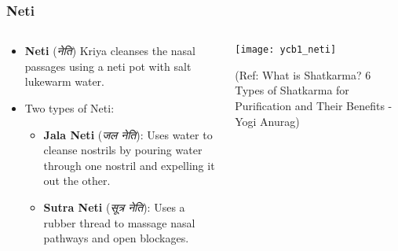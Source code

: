 \begin{frame}[fragile]\frametitle{Neti}
\begin{columns}
    \begin{column}[T]{0.5\linewidth}
      \begin{itemize}
          \item \textbf{Neti} (\textit{नेति}) Kriya cleanses the nasal passages using a neti pot with salt lukewarm water.
          \item Two types of Neti:
            \begin{itemize}
              \item \textbf{Jala Neti} (\textit{जल नेति}): Uses water to cleanse nostrils by pouring water through one nostril and expelling it out the other.
              \item \textbf{Sutra Neti} (\textit{सूत्र नेति}): Uses a rubber thread to massage nasal pathways and open blockages.
            \end{itemize}
      \end{itemize}
    \end{column}
    \begin{column}[T]{0.5\linewidth}
        \begin{center}
        \texttt{[image: ycb1\_neti]}
		
		{\tiny (Ref: What is Shatkarma? 6 Types of Shatkarma for Purification and Their Benefits - Yogi Anurag)}	
        \end{center}	
    \end{column}
\end{columns}
\end{frame}


